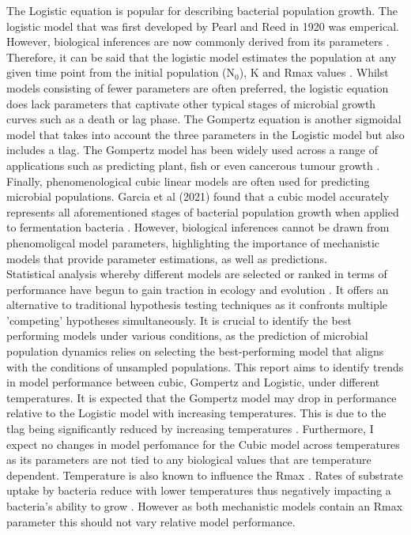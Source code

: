 \documentclass[12pt]{article}
\begin{document}
The Logistic equation is popular for describing bacterial population growth. The logistic model that was first developed by Pearl and Reed in 1920 was emperical. However, biological inferences are now commonly derived from its parameters \cite{WACHENHEIM2003157} \cite{Pearl1920}. Therefore, it can be said that the logistic model estimates the population at any given time point from the initial population ($\mathrm{N}_0$), K and Rmax values \cite{WACHENHEIM2003157}. Whilst models consisting of fewer parameters are often preferred, the logistic equation does lack parameters that captivate other typical stages of microbial growth curves such as a death or lag phase. The Gompertz equation is another sigmoidal model that takes into account the three parameters in the Logistic model but also includes a tlag. The Gompertz model has been widely used across a range of applications such as predicting plant, fish or even cancerous tumour growth \cite{Tjrve2017}. Finally, phenomenological cubic linear models are often used for predicting microbial populations. Garcia et al (2021) found that a cubic model accurately represents all aforementioned stages of bacterial population growth when applied to fermentation bacteria \cite{Garcia2021}. However, biological inferences cannot be drawn from phenomoligcal model parameters, highlighting the importance of mechanistic models that provide parameter estimations, as well as predictions.\\

Statistical analysis whereby different models are selected or ranked in terms of performance have begun to gain traction in ecology and evolution \cite{JOHNSON2004101}. It offers an alternative to traditional hypothesis testing techniques as it confronts multiple 'competing' hypotheses simultaneously. It is crucial to identify the best performing models under various conditions, as the prediction of microbial population dynamics relies on selecting the best-performing model that aligns with the conditions of unsampled populations. This report aims to identify trends in model performance between cubic, Gompertz and Logistic, under different temperatures. It is expected that the Gompertz model may drop in performance relative to the Logistic model with increasing temperatures. This is due to the tlag being significantly reduced by increasing temperatures \cite{ABA2021109108}. Furthermore, I expect no changes in model perfomance for the Cubic model across temperatures as its parameters are not tied to any biological values that are temperature dependent. Temperature is also known to influence the Rmax\cite{Ward1972} \cite{Dey2020}. Rates of substrate uptake by bacteria reduce with lower temperatures thus negatively impacting a bacteria's ability to grow \cite{Nedwell1994}. However as both mechanistic models contain an Rmax parameter this should not vary relative model performance.\\
\end{document}

